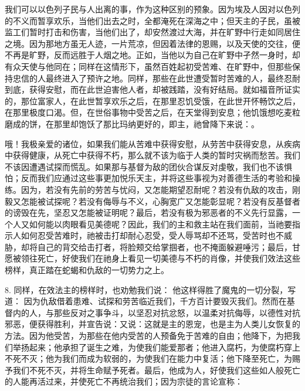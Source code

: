 我们可以以色列子民与人出离的事，作为这种区别的预象。因为埃及人因对以色列的不义而暂享欢乐，当他们出去之时，全都淹死在深海之中；但天主的子民，虽被监工们暂时打击和伤害，当他们出了，却安然渡过大海，并在旷野中行走如同居住之境。因为那地方虽无人迹，一片荒凉，但因着法律的恩赐，以及天使的交往，便不再是旷野，反而远胜于人烟之地。正如，当他以为自己在旷野中孑然一身时，却有众天使与他同在；同样在这情形下，虽然百姓起初受苦难、在旷野中，但那些保持忠信的人最终进入了预许之地。同样，那些在此世遭受暂时苦难的人，最终忍耐到底，获得安慰，而在此世迫害他人者，却被践踏，没有好结局。就如福音所证实的，那位富家人，在此世暂享欢乐之后，在那里忍饥受饿，在此世开怀畅饮之后，在那里极度口渴。但，在世俗事物中受苦之后，在天堂得到安息；他饥饿想吃麦粒磨成的饼，在那里却饱饫了那比玛纳更好的，即主，祂曾降下来说：。\par

哦！我极亲爱的诸位，如果我们能从苦难中获得安慰，从劳苦中获得安息，从疾病中获得健康，从死亡中获得不朽，那么就不该为临于人类的暂时灾祸而愁苦。我们不该因遭遇试探而慌乱。如果那与基督为敌的团伙合谋反对虔敬，我们也不该惧怕；反而我们应通过这些事更加悦乐天主，并将这些事视为对善德生活的考验和操练。因为，若没有先前的劳苦与忧闷，又怎能期望忍耐呢？若没有仇敌的攻击，刚毅又怎能被试探呢？若没有侮辱与不义，心胸宽广又怎能彰显呢？若没有反基督者的谤毁在先，坚忍又怎能被证明呢？最后，若没有极为邪恶者的不义先行显露，一个人又如何能以肉眼看见美德呢？因此，我们的主和救主站在我们面前，当祂要指示人如何忍受苦难时，祂被击打却耐心忍受，受人辱骂却不还骂，受苦时也不威胁，却将自己的背交给击打者，将脸颊交给掌掴者，也不掩面躲避唾污；最后，甘愿被领往死亡，好使我们在祂身上看见一切美德与不朽的肖像，并使我们效法这些榜样，真正踏在蛇蝎和仇敌的一切势力之上。\par

8. 同样，在效法主的榜样时，也劝勉我们说： 他这样得胜了魔鬼的一切分裂，写道： 因为仇敌借着患难、试探和劳苦临近我们，千方百计要毁灭我们。然而在基督内的人，与那些反对之事争斗，以坚忍对抗忿怒，以温柔对抗侮辱，以德性对抗邪恶，便获得胜利，并宣告说：又说：这就是主的恩宠，也是主为人类儿女恢复的方法。因为他受苦，为那些在他内受苦的人预备免于苦难的自由；他降下，为把我们举扬起来；他承担了诞生之难，为使我们能爱那者；他进入腐朽，为使腐朽穿上不死不灭；他为我们而成为软弱的，为使我们在能力中复活；他下降至死亡，为赐予我们不死不灭，并将生命赋予死者。最后，他成为人，好使我们这些如人般死亡的人能再活过来，并使死亡不再统治我们；因为宗徒的言论宣称：\par

